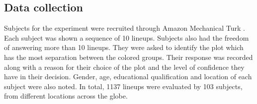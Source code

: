 
\subsection{Data collection}

Subjects  for the experiment were recruited through Amazon Mechanical Turk  \citep{turk}. Each subject was shown a sequence of 10 lineups. Subjects also had the freedom of answering more than 10 lineups. They were asked to identify the plot which has the most separation between the colored groups. Their response was recorded along with a reason for their choice of the plot and the level of confidence they have in their decision.  Gender, age, educational qualification and location of each subject were also noted. In total, 1137 lineups were evaluated by 103 subjects, from different locations across the globe.







